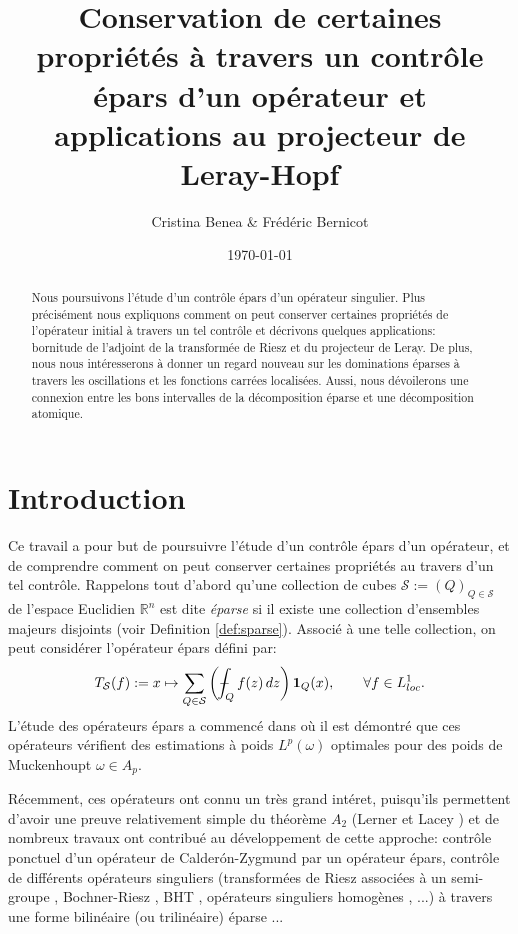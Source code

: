 \documentclass[11pt]{amsart}
\title[Contr\^ole \'epars d'un op\'erateur et applications]{Conservation de certaines propri\'et\'es \`a travers un contr\^ole \'epars d'un op\'erateur et applications au projecteur de Leray-Hopf}
\author{Cristina Benea \& Fr\'{e}d\'{e}ric Bernicot}
\date{\today}
\newcommand{\rr}{\mathbb}
\newcommand{\mcS}{{\mathcal S}}
\def\Xint#1{\mathchoice
   {\XXint\displaystyle\textstyle{#1}}%
   {\XXint\textstyle\scriptstyle{#1}}%
   {\XXint\scriptstyle\scriptscriptstyle{#1}}%
   {\XXint\scriptscriptstyle\scriptscriptstyle{#1}}%
   \!\int}
\def\XXint#1#2#3{{\setbox0=\hbox{$#1{#2#3}{\int}$}
     \vcenter{\hbox{$#2#3$}}\kern-.5\wd0}}
\def\aver#1{\Xint-_{#1}}
\begin{document}
\begin{abstract} Nous poursuivons l'\'etude d'un contr\^ole \'epars d'un op\'erateur singulier. Plus pr\'ecis\'ement nous expliquons comment on peut conserver certaines propri\'et\'es de l'op\'erateur initial \`a travers un tel contr\^ole et d\'ecrivons quelques applications: bornitude de l'adjoint de la transform\'ee de Riesz et du projecteur de Leray. De plus, nous nous int\'eresserons \`a donner un regard nouveau sur les dominations \'eparses \`a travers les oscillations et les fonctions carr\'ees localis\'ees. Aussi, nous d\'evoilerons une connexion entre les bons intervalles de la d\'ecomposition \'eparse et une d\'ecomposition atomique.
\end{abstract}

\maketitle


\begin{quote}
\footnotesize\tableofcontents
\end{quote}

\section{Introduction}


Ce travail a pour but de poursuivre l'\'etude d'un contr\^ole \'epars d'un op\'erateur, et de comprendre comment on peut conserver certaines propri\'et\'es au travers d'un tel contr\^ole.
Rappelons tout d'abord qu'une collection de cubes $\mcS:=(Q)_{Q\in \mcS}$ de l'espace Euclidien ${\rr R}^n$ est dite {\it \'eparse} si il existe une collection d'ensembles majeurs disjoints (voir Definition \ref{def:sparse}).  Associ\'e \`a une telle collection, on peut consid\'erer l'op\'erateur \'epars d\'efini par:
$$ T_{\mcS}(f) := x \mapsto  \sum_{Q\in \mcS} \left( \aver{Q} f(z) \, dz\right) {\bf 1}_{Q}(x)   , \qquad \forall f\in L^1_{loc}.$$
L'\'etude des op\'erateurs \'epars a commenc\'e dans \cite{Lernerfirst,CUMP} o\`u il est d\'emontr\'e que ces op\'erateurs v\'erifient des estimations \`a poids $L^p(\omega)$ optimales pour des poids de Muckenhoupt $\omega \in A_p$.

 R\'ecemment, ces op\'erateurs ont connu un tr\`es grand int\'eret, puisqu'ils permettent d'avoir une preuve relativement simple du th\'eor\`eme $A_2$ (Lerner \cite{Lerner1,Lerner2,Lerner-simplerA_2} et Lacey \cite{LaceyA_2}) et de nombreux travaux ont contribu\'e au d\'eveloppement de cette approche: contr\^ole ponctuel d'un op\'erateur de Calder\'on-Zygmund par un op\'erateur \'epars, contr\^ole de diff\'erents op\'erateurs singuliers (transform\'ees de Riesz associ\'ees \`a un semi-groupe \cite{BernicotFreyPetermichl}, Bochner-Riesz \cite{BeneaBernicotLuque}, BHT \cite{weighted_BHT}, op\'erateurs singuliers homog\`enes \cite{CCDO}, ...) \`a travers une forme bilin\'eaire (ou trilin\'eaire) \'eparse ... 
\end{document}
